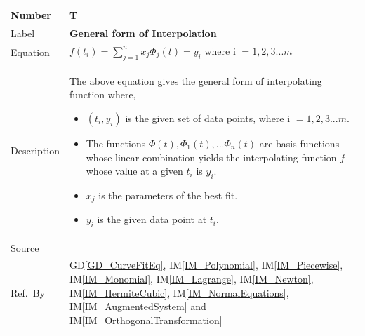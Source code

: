 \documentclass[12pt]{article}
\newcommand{\colAwidth}{0.13\textwidth}
\newcommand{\colBwidth}{0.82\textwidth}
\newcommand{\dref}[1]{GD\ref{#1}}
\newcounter{theorynum} %
\newcommand{\iref}[1]{IM\ref{#1}}
\begin{document}
~\newline
\noindent
\begin{minipage}{\textwidth}
	\renewcommand*{\arraystretch}{1.5}
	\begin{tabular}{| p{\colAwidth} | p{\colBwidth}|}
		\hline
		\rowcolor[gray]{0.9}
		Number& T{theorynum}\thetheorynum \label{T_Interpolation}\\
		\hline
		Label&\bf General form of Interpolation\\
		\hline
		Equation&  $f(t_i) = \sum_{j=1}^{n}x_j \Phi_j (t) = y_i$ where i $= 1,2,3...m$\\
		\hline
		Description & 
		The above equation gives the general form of interpolating function where,
		\begin{itemize}
			\item $(t_i,y_i)$ is the given set of data points, where i $= 1,2, 3...m$.
			\item The functions $\Phi(t), \Phi_1(t), ... \Phi_n(t)$ are basis functions whose linear combination yields the interpolating function $f$ whose value at a given $t_i$ is $y_i$.
			\item $x_j$ is the parameters of the best fit.
			\item $y_i$ is the given data point at $t_i$.
		\end{itemize}\\
		\hline
		Source & ~\cite{Health1997}\\
		
		\hline
		Ref.\ By & \dref{GD_CurveFitEq}, \iref{IM_Polynomial}, \iref{IM_Piecewise}, \iref{IM_Monomial}, \iref{IM_Lagrange}, \iref{IM_Newton}, \iref{IM_HermiteCubic}, \iref{IM_NormalEquations}, \iref{IM_AugmentedSystem} and \iref{IM_OrthogonalTransformation}\\
		\hline
	\end{tabular}
\end{minipage}\\
~\newline
\noindent
\end{document}

